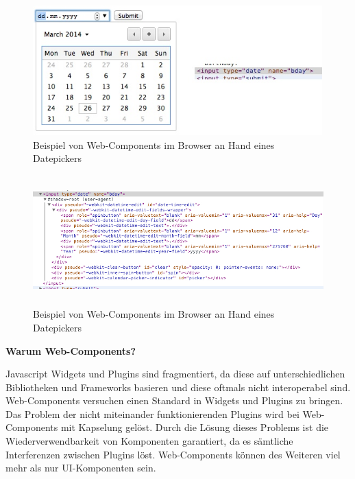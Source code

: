 \begin{figure}[h]
\centering
\includegraphics[height=5.0cm]{images/datepicker.jpg}
\caption[
Beispiel von Web-Components im Browser an Hand eines Datepickers, Urldate: 04.2014
\newline
\small\texttt{\url{https://s3.amazonaws.com/infinum.web.production/repository\_items/files/000/000/238/original/datepicker.jpg}}
]{Beispiel von Web-Components im Browser an Hand eines Datepickers}
\label{fig:3_Datepicker_Visuals}
\end{figure}

\begin{figure}[h]
\centering
\includegraphics[height=5.0cm]{images/datepicker_shadow_dom.jpg}
\caption[
Beispiel von Web-Components im Browser an Hand eines Datepickers, Urldate: 04.2014
\newline
\small\texttt{\url{https://s3.amazonaws.com/infinum.web.production/repository\_items/files/000/000/236/original/datepicker\_shadow\_dom.jpg}}
]{Beispiel von Web-Components im Browser an Hand eines Datepickers}
\label{fig:3_Datepicker_Source}
\end{figure}

\textbf{Warum Web-Components?}

Javascript Widgets und Plugins sind fragmentiert, da diese auf unterschiedlichen Bibliotheken und Frameworks basieren und diese oftmals nicht interoperabel sind. Web-Components versuchen einen Standard in Widgets und Plugins zu bringen. Das Problem der nicht miteinander funktionierenden Plugins wird bei Web-Components mit Kapselung gelöst. Durch die Lösung dieses Problems ist die Wiederverwendbarkeit von Komponenten garantiert, da es sämtliche Interferenzen zwischen Plugins löst. Web-Components können des Weiteren viel mehr als nur UI-Komponenten sein.

